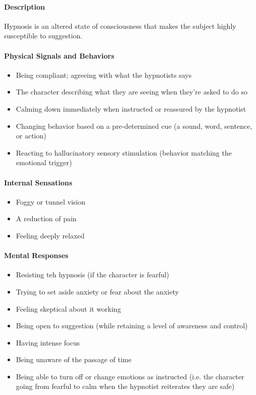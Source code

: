 \paragraph{Description} Hypnosis is an altered state of consciousness that makes the subject
highly susceptible to suggestion.

\paragraph{Physical Signals and Behaviors}

\begin{itemize}
    \item Being compliant; agreeing with what the hypnotists says
    \item The character describing what they are seeing when they're asked to do so
    \item Calming down immediately when instructed or reassured by the hypnotist
    \item Changing behavior based on a pre-determined cue (a sound, word, sentence, or action)
    \item Reacting to hallucinatory sensory stimulation (behavior matching the emotional trigger)
\end{itemize}

\paragraph{Internal Sensations}

\begin{itemize}
    \item Foggy or tunnel vision
    \item A reduction of pain
    \item Feeling deeply relaxed
\end{itemize}


\paragraph{Mental Responses}

\begin{itemize}
    \item Resisting teh hypnosis (if the character is fearful)
    \item Trying to set aside anxiety or fear about the anxiety
    \item Feeling skeptical about it working
    \item Being open to suggestion (while retaining a level of awareness and control)
    \item Having intense focus
    \item Being unaware of the passage of time
    \item Being able to turn off or change emotions as instructed (i.e. the 
    character going from fearful to calm when the hypnotist reiterates they are safe)
\end{itemize}




